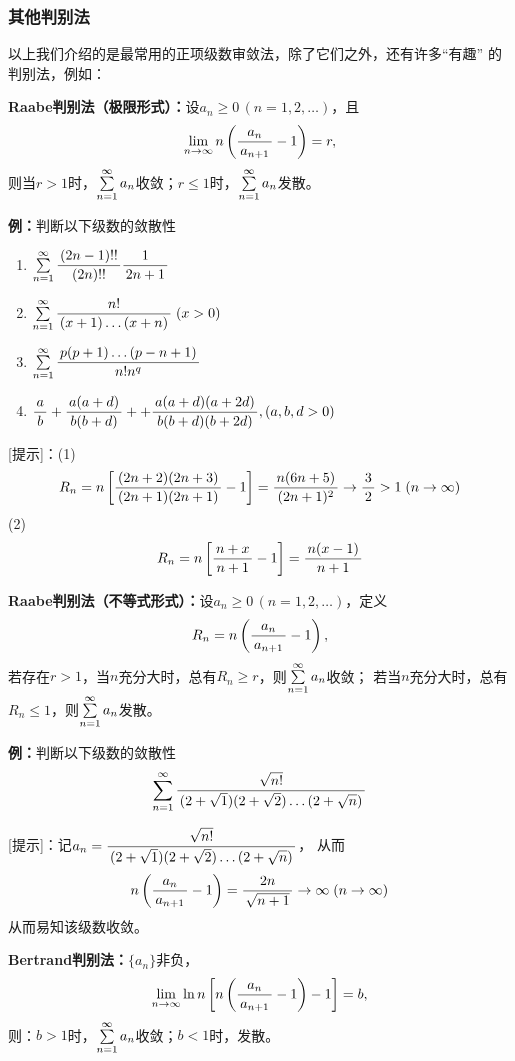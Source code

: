 \begin{shaded}

\subsubsection{其他判别法}

以上我们介绍的是最常用的正项级数审敛法，除了它们之外，还有许多“有趣”
的判别法，例如：

\begin{tcolorbox}
	{\bf Raabe判别法（极限形式）：}设$a_n\geq 0\,(n=1,2,\ldots)$，且
	$$\limn n\left(\df{a_n}{a_{n+1}}-1\right)=r,$$
	则当$r>1$时，$\sumn a_n$收敛；$r\leq 1$时，$\sumn a_n$发散。	
\end{tcolorbox}

{\bf 例：}判断以下级数的敛散性
\begin{enumerate}[(1)]
  \setlength{\itemindent}{1cm}
  \item $\sumn\df{(2n-1)!!}{(2n)!!}\df 1{2n+1}$
  \item $\sumn\df{n!}{(x+1)\ldots(x+n)}\;(x>0)$
  \item $\sumn\df{p(p+1)\ldots(p-n+1)}{n!n^q}$
  \item $\df ab+\df{a(a+d)}{b(b+d)}++\df{a(a+d)(a+2d)}{b(b+d)(b+2d)},(a,b,d>0)$
\end{enumerate}

[提示]：(1)
$$R_n=n\left[\df{(2n+2)(2n+3)}{(2n+1)(2n+1)}-1\right]
=\df{n(6n+5)}{(2n+1)^2}\to\df32>1\;(n\to\infty)$$
(2)
$$R_n=n\left[\df{n+x}{n+1}-1\right]=\df{n(x-1)}{n+1}$$

\begin{tcolorbox}
	{\bf Raabe判别法（不等式形式）：}设$a_n\geq 0\,(n=1,2,\ldots)$，定义
	$$R_n=n\left(\df{a_n}{a_{n+1}}-1\right),$$
	若存在$r>1$，当$n$充分大时，总有$R_n\geq r$，则$\sumn a_n$收敛；
	若当$n$充分大时，总有$R_n\leq 1$，则$\sumn a_n$发散。	
\end{tcolorbox}

{\bf 例：}判断以下级数的敛散性
$$\sumn\df{\sqrt{n!}}{(2+\sqrt 1)(2+\sqrt 2)\ldots(2+\sqrt n)}$$

[提示]：记$a_n=\df{\sqrt{n!}}{(2+\sqrt 1)(2+\sqrt 2)\ldots(2+\sqrt n)}$，
从而
$$n\left(\df{a_n}{a_{n+1}}-1\right)=\df{2n}{\sqrt{n+1}}\to\infty\;(n\to\infty)$$
从而易知该级数收敛。

\begin{tcolorbox}
	{\bf Bertrand判别法：}$\{a_n\}$非负，
	$$\limn\ln n\left[n\left(\df{a_n}{a_{n+1}}-1\right)-1\right]=b,$$
	则：$b>1$时，$\sumn a_n$收敛；$b<1$时，发散。
\end{tcolorbox}


\end{shaded}
